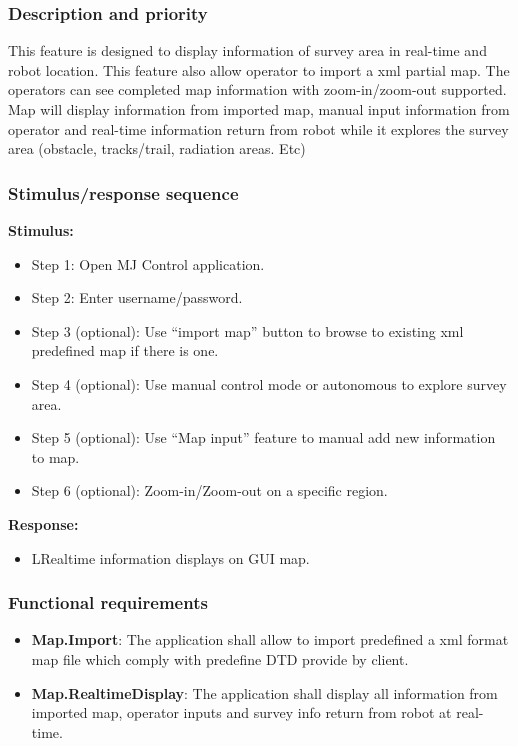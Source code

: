 \documentclass[10pt,a4paper,titlepage]{article}
\begin{document}
	\subsubsection{Description and priority}
	\text This feature is designed to display information of survey area in real-time and robot location. This feature also allow operator to import a xml partial map. The operators can see completed map information with zoom-in/zoom-out supported. Map will display information from imported map, manual input information from operator and real-time information return from robot while it explores the survey area (obstacle, tracks/trail, radiation areas. Etc)
	\subsubsection{Stimulus/response sequence}
	\textbf{Stimulus:}
	\begin{itemize}
	
		\item Step 1: Open MJ Control application.
		\item Step 2: Enter username/password.
		\item Step 3 (optional): Use “import map” button to browse to existing xml predefined map if there is one.
		\item Step 4 (optional): Use manual control mode or autonomous to explore survey area.
		\item Step 5 (optional): Use “Map input” feature to manual add new information to map.
		\item Step 6 (optional): Zoom-in/Zoom-out on a specific region.
		
	\end{itemize}
	\textbf{Response:}
	\begin{itemize}
		\item LRealtime information displays on GUI map.
	\end{itemize}
	\subsubsection{Functional requirements}
	\begin{itemize}
		\item \textbf{Map.Import}: The application shall allow to import predefined a xml format map file which comply with predefine DTD provide by client.
		\item \textbf{Map.RealtimeDisplay}: The application shall display all information from imported map, operator inputs and survey info return from robot at real-time.
	\end{itemize}
	
\end{document}
